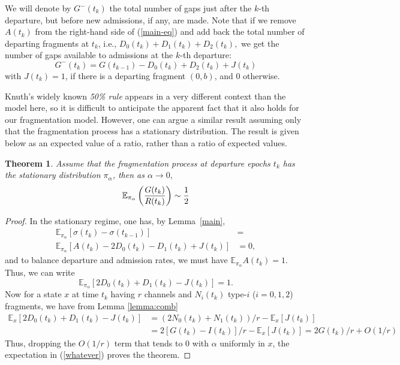 \documentclass{amsart}
\newtheorem{theorem}{Theorem}
\begin{document}
We will denote by $G^-(t_k)$  the total number of
gaps just after the $k$-th departure, but before new admissions, if
any, are made. Note that if we remove $A(t_k)$ from the right-hand
side of (\ref{main-eq}) and add back the total number of departing
fragments at $t_k$, i.e., $D_0(t_k)+D_1(t_k)+D_2(t_k),$ we get the
number of gaps available to admissions at the $k$-th departure:
 \begin{equation} \label{eq:Delta-H}
        G^-(t_k) = G(t_{k-1}) -D_0(t_k) + D_2(t_k) + J(t_k)
    \end{equation}
with $J(t_k) = 1$, if there is a departing fragment $(0,b)$, and $0$
otherwise.

Knuth's widely known \textit{50\% rule} appears in a very different
context than the model here, so it is difficult to anticipate the
apparent fact that it also holds for our fragmentation model.
However, one can argue a similar result assuming only that the
fragmentation process has a stationary distribution.  The result is given
below as an expected value of a ratio, rather than a ratio of expected
values.
\begin{theorem}\label{stab-Har}
Assume that the fragmentation process at departure epochs $t_k$ has the
stationary distribution $\pi_\alpha$, then as $\alpha \rightarrow 0,$
$$ \mathbb{E}_{\pi_\alpha}\left( {G(t_k) \over R(t_k)} \right) \sim \frac{1}{2} $$
\end{theorem}
\begin{proof}
In the stationary regime, one has, by Lemma~\ref{main},
\begin{align*}
\mathbb{E}_{\pi_\alpha} [ \sigma(t_{k}) - \sigma(t_{k-1})] &= \\
\mathbb{E}_{\pi_\alpha}[A(t_{k}) - 2D_0(t_{k}) -
D_1(t_{k}) + J(t_{k})]
& =  0,
\end{align*}
and to balance departure and admission rates, we must have
$\mathbb{E}_{\pi_\alpha} A(t_{k}) = 1$.  Thus, we can write
\begin{equation}
\label{whatever}
 \mathbb{E}_{\pi_\alpha}[2D_0(t_{k}) + D_1(t_{k}) - J(t_{k})] = 1.
\end{equation}
Now for a state $x$ at time $t_k$ having $r$ channels and $N_i(t_k)$
type-$i$ ($i=0,1,2$) fragments, we have from Lemma \ref{lemma:comb}
\begin{align*}
\mathbb{E}_x[2D_0(t_{k}) + D_1(t_{k}) - J(t_{k})] & = 
(2N_0(t_k) + N_1(t_k))/r - \mathbb{E}_x[J(t_{k})]  \\ & =
2[G(t_k)  - I(t_k)]/ r - \mathbb{E}_x[J(t_{k})]  =   2G(t_k) / r + O\left(1/r\right)
\end{align*}
Thus, dropping the $O(1/r)$  term that tends to 0 with $\alpha$ uniformly in $x$, the
expectation in (\ref{whatever}) proves the theorem.
\end{proof}
\end{document}
